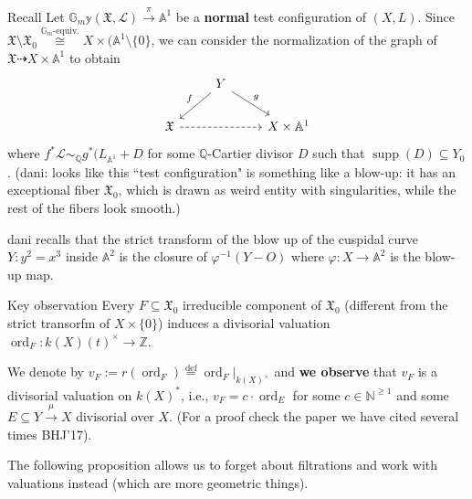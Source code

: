 \begin{thing7}{Recall}\leavevmode
Let \(\mathbb{G}_m \mathbb{y} (\mathfrak{X},\mathcal{L})\xrightarrow{\pi}\mathbb{A}^1\) be a \textbf{normal} test configuration of \((X,L)\). Since \(\mathfrak{X}\setminus \mathfrak{X}_0 \overset{\mathbb{G}_m\text{-equiv.} }{\cong}X \times (\mathbb{A}^1 \setminus\{0\}\), we can consider the normalization of the graph of \(\mathfrak{X} \dashrightarrow X \times \mathbb{A}^1\) to obtain
\[\begin{tikzcd}
&Y\arrow[dl,"f",swap]\arrow[dr,"g"]\\
\mathfrak{X}\arrow[rr,dashed]&&X \times \mathbb{A}^1
\end{tikzcd}\]
where \(f^*\mathcal{L} \sim_\mathbb{Q}g^* (L_{\mathbb{A}^1}+D\) for some \(\mathbb{Q}\)-Cartier divisor \(D\) such that \(\operatorname{supp}(D) \subseteq Y_0\). {\color{6}(dani: looks like this ``test configuration" is something like a blow-up: it has an exceptional fiber \(\mathfrak{X}_0\), which is drawn as weird entity with singularities, while the rest of the fibers look smooth.)}
\end{thing7}

\begin{thing7}{dani recalls}\leavevmode
that the strict transform of the blow up of the cuspidal curve \(Y:y^2=x^3\) inside \(\mathbb{A}^2\) is the closure of \(\varphi^{-1}(Y-O)\) where \(\varphi:X \to \mathbb{A}^2\) is the blow-up map.
\end{thing7}

\begin{thing8}{Key observation}\leavevmode
Every \(F \subseteq \mathfrak{X}_0\) irreducible component of \(\mathfrak{X}_0\) (different from the strict transorfm of \(X \times \{0\}\)) induces a divisorial valuation \(\operatorname{ord}_F: k (X)(t)^\times \longrightarrow \mathbb{Z}\).

We denote by \(v_F:= r (\operatorname{ord}_F)\overset{\operatorname{def}}{=} \operatorname{ord}_F |_{k(X)^\times}\) and \textbf{we observe} that \(v_F\) is a divisorial valuation on \(k(X)^*\), i.e., \(v_F=c\cdot \operatorname{ord}_E\) for some \(c \in \mathbb{N}^{\geq 1}\) and some \(E \subseteq Y \xrightarrow{\mu}X\) divisorial over \(X\). (For a proof check the paper we have cited several times BHJ'17).
\end{thing8}

The following proposition allows us to forget about filtrations and work with valuations instead (which are more geometric things).

